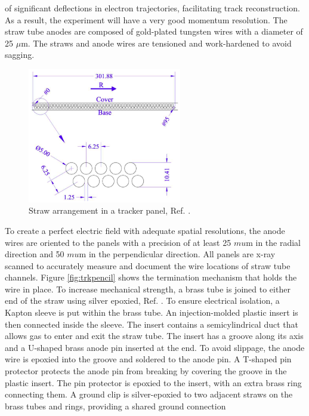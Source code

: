of significant deflections in electron trajectories, facilitating track reconstruction. As a result, the experiment 
will have a very good momentum resolution. The straw tube anodes are composed of gold-plated tungsten wires 
with a diameter of 25 $\mu$m. The straws and anode wires are tensioned and work-hardened to avoid sagging.
\begin{figure}[!h]
    \centering
    \includegraphics[width =0.6\textwidth]{figures/png/Screenshot_20240326_234405.png}
    \caption{Straw arrangement in a tracker panel, Ref. \cite{trk}.}
    \label{fig:trktubes}
    \end{figure}
To create a perfect electric field with adequate spatial resolutions, the anode wires are oriented 
to the panels with a precision of at least 25 $mu$m in the radial direction and 50 $mu$m in the 
perpendicular direction. All panels are x-ray scanned to accurately measure and document the wire 
locations of straw tube channels. Figure \ref{fig:trkpencil} shows the 
termination mechanism that holds the wire in place.
To increase mechanical strength, a brass tube is joined to either end of the straw using silver epoxied, Ref. \cite{bartoszek2015mu2e}. 
To ensure electrical isolation, a Kapton sleeve is put within the brass tube. An injection-molded plastic insert is then connected 
inside the sleeve. The insert contains a semicylindrical duct that allows gas to enter and exit the straw tube. The insert 
has a groove along its axis and a U-shaped brass anode pin inserted at the end. To avoid slippage, the anode wire is 
epoxied into the groove and soldered to the anode pin.
A T-shaped pin protector protects the anode pin from breaking by covering the groove in the plastic insert. 
The pin protector is epoxied to the insert, with an extra brass ring connecting them. A ground clip 
is silver-epoxied to two adjacent straws on the brass tubes and rings, providing a shared ground connection 
